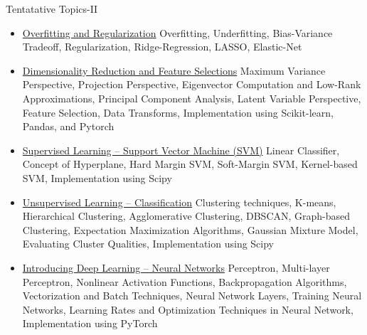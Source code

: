 \documentclass[aspectratio=169,xcolor=dvipsnames,svgnames,x11names,fleqn]{beamer}
\begin{document}
\begin{frame}{Tentatative Topics-II}


\footnotesize
\begin{itemize}


    \item  \color{DarkRed} \underline{Overfitting and Regularization} Overfitting, Underfitting, Bias-Variance Tradeoff, Regularization, Ridge-Regression, LASSO, Elastic-Net
    
    \item \color{DarkRed} \underline{Dimensionality Reduction and Feature Selections}  Maximum Variance Perspective, Projection Perspective, Eigenvector Computation and Low-Rank Approximations, Principal Component Analysis, Latent Variable Perspective,  Feature Selection, Data Transforms, Implementation using Scikit-learn, Pandas, and Pytorch
    
    \item   \color{DarkRed}  \underline{Supervised Learning -- Support Vector Machine (SVM)} Linear Classifier, Concept of Hyperplane, Hard Margin SVM, Soft-Margin SVM, Kernel-based SVM, Implementation using Scipy
      
   

     \item  \color{DarkRed} \underline{Unsupervised Learning -- Classification} Clustering techniques, K-means, Hierarchical Clustering, Agglomerative Clustering, DBSCAN, Graph-based Clustering, Expectation Maximization Algorithms, Gaussian Mixture Model, Evaluating Cluster Qualities, Implementation using Scipy

      \item  \color{DarkRed} \underline{Introducing Deep Learning -- Neural Networks} Perceptron, Multi-layer Perceptron, Nonlinear Activation Functions, Backpropagation Algorithms, Vectorization and Batch Techniques, Neural Network Layers, Training Neural Networks, Learning Rates and Optimization Techniques in Neural Network, Implementation using PyTorch

\end{itemize}
\end{frame}
\end{document}
